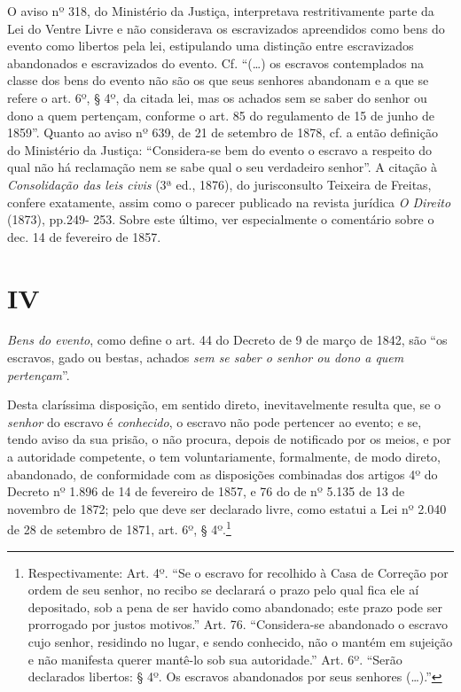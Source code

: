 {  O aviso nº 318, do Ministério da Justiça, interpretava restritivamente
  parte da Lei do Ventre Livre e não considerava os escravizados
  apreendidos como bens do evento como libertos pela lei, estipulando
  uma distinção entre escravizados abandonados e escravizados do evento.
  Cf. ``(\ldots{}) os escravos contemplados na classe dos bens do evento não
  são os que seus senhores abandonam e a que se refere o art. 6º, § 4º,
  da citada lei, mas os achados sem se saber do senhor ou dono a quem
  pertençam, conforme o art. 85 do regulamento de 15 de junho de 1859''. Quanto ao
  aviso nº 639, de 21 de setembro de 1878, cf. a então definição do Ministério da
  Justiça: ``Considera-se bem do evento o escravo a respeito do qual não
  há reclamação nem se sabe qual o seu verdadeiro senhor''. A citação à
  \emph{Consolidação das leis civis} (3ª ed., 1876), do jurisconsulto
  Teixeira de Freitas, confere exatamente, assim como o parecer
  publicado na revista jurídica \emph{O Direito} (1873), pp.249- 253.
  Sobre este último, ver especialmente o comentário sobre o dec.
  14 de fevereiro de 1857.}

\section*{IV}

\emph{Bens do evento}, como define o art. 44 do Decreto de 9 de março de
1842, são ``os escravos, gado ou bestas, achados \emph{sem se saber o
senhor ou dono a quem pertençam}''.

Desta claríssima disposição, em sentido direto, inevitavelmente resulta
que, se o \emph{senhor} do escravo é \emph{conhecido}, o escravo não
pode pertencer ao evento; e se, tendo aviso da sua prisão, o não
procura, depois de notificado por os meios, e por a autoridade
competente, o tem voluntariamente, formalmente, de modo direto,
abandonado, de conformidade com as disposições combinadas dos artigos 4º
do Decreto nº 1.896 de 14 de fevereiro de 1857, e 76 do de nº 5.135 de
13 de novembro de 1872; pelo que deve ser declarado livre, como estatui
a Lei nº 2.040 de 28 de setembro de 1871, art. 6º, § 4º.\footnote{
  Respectivamente: Art. 4º. ``Se o escravo for recolhido à Casa de
  Correção por ordem de seu senhor, no recibo se declarará o prazo pelo
  qual fica ele aí depositado, sob a pena de ser havido como abandonado;
  este prazo pode ser prorrogado por justos motivos.'' Art. 76.
  ``Considera-se abandonado o escravo cujo senhor, residindo no lugar, e
  sendo conhecido, não o mantém em sujeição e não manifesta querer
  mantê-lo sob sua autoridade.'' Art. 6º. ``Serão declarados libertos: § 4º.
  Os escravos abandonados por seus senhores (\ldots{}).''}


